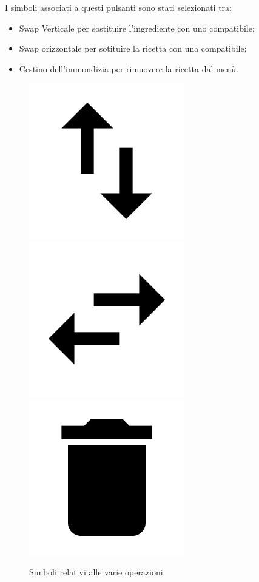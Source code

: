 I simboli associati a questi pulsanti sono stati selezionati tra:
\begin{itemize}
	\item Swap Verticale per sostituire l'ingrediente con uno compatibile;
	\item Swap orizzontale per sotituire la ricetta con una compatibile;
	\item Cestino dell'immondizia per rimuovere la ricetta dal menù.
\end{itemize}
\begin{figure}[H]
	\centering
		\includegraphics[width=.12\textwidth]{img/icons/swapvert}
		\includegraphics[width=.12\textwidth]{img/icons/swaphor}
		\includegraphics[width=.12\textwidth]{img/icons/delete}
	\caption{Simboli relativi alle varie operazioni}
\end{figure}

